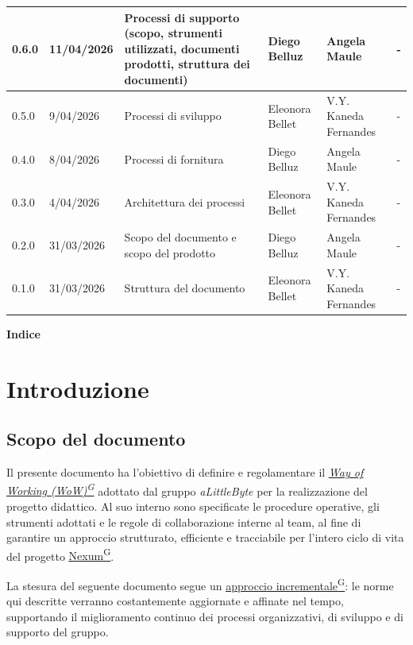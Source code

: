 \documentclass[a4paper,12pt]{article}
\providecommand{\glslink}[2]{\href{https://alittlebyte-19.github.io/Documentazione/glossario.html\#gls-#1}{\underline{#2}\textsuperscript{\scriptsize G}}}
\begin{document}
{\begin{longtable}{|p{1.1cm}|p{2.0cm}|p{4.3cm}|p{2.8cm}|p{2.0cm}|p{2.0cm}|}
        \hline 
        0.6.0 & 11/04/2026 & Processi di supporto (scopo, strumenti utilizzati, documenti prodotti, struttura dei documenti) & Diego Belluz & Angela Maule & - \\
        \hline
        0.5.0 & 9/04/2026 & Processi di sviluppo & Eleonora Bellet & V.Y. Kaneda Fernandes & - \\
        \hline
        0.4.0 & 8/04/2026 & Processi di fornitura & Diego Belluz & Angela Maule & - \\
        \hline
        0.3.0 & 4/04/2026 & Architettura dei processi & Eleonora Bellet & V.Y. Kaneda Fernandes & - \\
        \hline
        0.2.0 & 31/03/2026 & Scopo del documento e scopo del prodotto & Diego Belluz & Angela Maule & - \\
        \hline
        0.1.0 & 31/03/2026 & Struttura del documento & Eleonora Bellet & V.Y. Kaneda Fernandes & - \\
    \end{longtable}
}
\newpage

\begin{center} 
    {\Large \textbf{Indice}}
\end{center}

\vspace{0.6cm}

\tableofcontents

\newpage
{}
\setcounter{page}{4}

\section{Introduzione}

\subsection{Scopo del documento}
Il presente documento ha l'obiettivo di definire e regolamentare il \textit{\glslink{way-of-working-wow}{Way of Working (WoW)}} adottato dal gruppo \textit{aLittleByte} per la realizzazione del progetto didattico. Al suo interno sono specificate le procedure operative, gli strumenti adottati e le regole di collaborazione interne al team, al fine di garantire un approccio strutturato, efficiente e tracciabile per l'intero ciclo di vita del progetto \glslink{nexum}{Nexum}. 

La stesura del seguente documento segue un \glslink{approccio-incrementale}{approccio incrementale}: le norme qui descritte verranno costantemente aggiornate e affinate nel tempo, supportando il miglioramento continuo dei processi organizzativi, di sviluppo e di supporto del gruppo.
\end{document}
